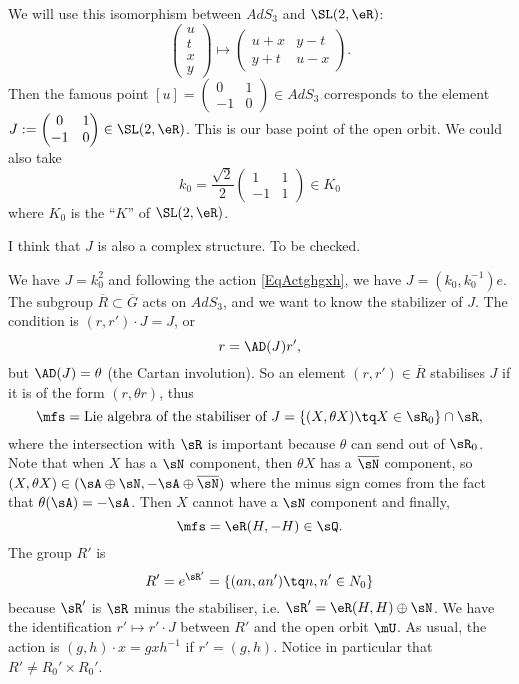 We will use this isomorphism between $AdS_3$ and $\SL(2,\eR)$:
\[
  \begin{pmatrix}
u\\t\\x\\y
\end{pmatrix}\mapsto
\begin{pmatrix}
u+x&y-t\\y+t&u-x
\end{pmatrix}.
\]
Then the famous point $[u]=\begin{pmatrix}
0&1\\-1&0
\end{pmatrix}\in AdS_3$ corresponds to the element $J:=\begin{pmatrix}
0&1\\-1&0
\end{pmatrix}\in \SL(2,\eR)$. This is our base point of the open orbit. We could also take
\[
  k_{0}=\frac{ \sqrt 2 }{ 2 }\begin{pmatrix}
1&1\\-1&1
\end{pmatrix}\in K_{0}
\]
where $K_{0}$ is the ``$K$'' of $\SL(2,\eR)$.
\begin{probleme}
    I think that $J$ is also a complex structure. To be checked.
\end{probleme}
We have $J=k_{0}^{2}$ and following the action \eqref{EqActghgxh}, we have $J=(k_{0},k_{0}^{-1})e$. The subgroup $\overline{R}\subset\overline{G}$ acts on $AdS_3$, and we want to know the stabilizer of $J$. The condition is $(r,r')\cdot J=J$, or
\[
  r=\AD(J)r',
\]
but $\AD(J)=\theta$ (the Cartan involution). So an element $(r,r')\in\overline{R}$ stabilises $J$ if it is of the form $(r,\theta r)$, thus
\[
  \mfs=\text{Lie algebra of the stabiliser of }J=\{ (X,\theta X)\tq X\in\sR_{0} \}\cap\sR,
\]
where the intersection with $\sR$ is important because $\theta$ can send out of $\sR_{0}$. Note that when $X$ has a $\sN$ component, then $\theta X$ has a $\overline{ \sN }$ component, so $(X,\theta X)\in(\sA\oplus\sN,-\sA\oplus\overline{ \sN })$ where the minus sign comes from the fact that $\theta(\sA)=-\sA$. Then $X$ cannot have a $\sN$ component and finally,
\[
  \mfs=\eR (H,-H)\in\sQ.
\]
The group $R'$ is
\begin{equation}
R'= e^{\sR'}=\{ (an,an')\tq n,n'\in N_{0} \}
\end{equation}
because $\sR'$ is $\sR$ minus the stabiliser, i.e. $\sR'=\eR(H,H)\oplus\sN$. We have the identification $r'\mapsto r'\cdot J$ between $R'$ and the open orbit $\mU$. As usual, the action is $(g,h)\cdot x=gxh^{-1}$ if $r'=(g,h)$. Notice in particular that $R'\neq R_{0}'\times R_{0}'$.

